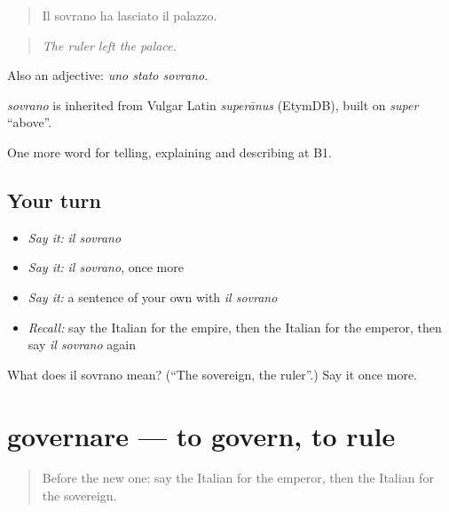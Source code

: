 \begin{quote}
Il sovrano ha lasciato il palazzo.
\end{quote}

\begin{quote}
\emph{The ruler left the palace.}
\end{quote}

Also an adjective: \emph{uno stato sovrano}.

\begin{cousinweb}
\emph{sovrano} is inherited from Vulgar Latin \emph{superānus} (EtymDB), built on \emph{super} \textquotedblleft{}above\textquotedblright{}.
\end{cousinweb}

\begin{grammarlens}[title={What you've built}]
One more word for telling, explaining and describing at B1.
\end{grammarlens}

\subsection*{Your turn}
\begin{itemize}
\raggedright
  \item \emph{Say it:} \emph{il sovrano}
  \item \emph{Say it:} \emph{il sovrano}, once more
  \item \emph{Say it:} a sentence of your own with \emph{il sovrano}
  \item \emph{Recall:} say the Italian for the empire, then the Italian for the emperor, then say \emph{il sovrano} again
\end{itemize}

\begin{tcolorbox}[breakable,colback=teal!4,colframe=teal!35!black,title={Before you move on}]
What does il sovrano mean? (\textquotedblleft{}The sovereign, the ruler\textquotedblright{}.) Say it once more.
\end{tcolorbox}
\section[governare]{governare — to govern, to rule}

\label{lesson:IT-C328-governare}



\begin{quote}
Before the new one: say the Italian for the emperor, then the Italian for the sovereign.
\end{quote}

